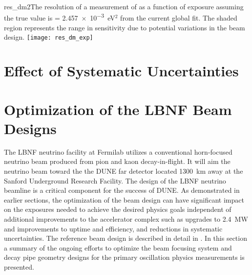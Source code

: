 \begin{cdrfigure}{res_dm2}{The resolution of a measurement of  as a function of exposure assuming the true value is  = \num{2.457e-3}~eV$^2$ from the current global fit. The shaded region represents the range in sensitivity due to potential variations in the beam design.  }
 \texttt{[image: res\_dm\_exp]}
\end{cdrfigure}

\section{Effect of Systematic Uncertainties}
\label{sec:physics-lbnosc-beamnd-req}


\section{Optimization of the LBNF Beam Designs}
\label{sec:physics-lbnosc-beam}

The LBNF neutrino facility at Fermilab utilizes a conventional
horn-focused neutrino beam produced from pion and kaon
decay-in-flight. It will aim the neutrino beam toward the the DUNE far
detector located \num{1300}~km away at the Sanford Underground Research
Facility.  The design of the LBNF neutrino beamline is a critical
component for the success of DUNE. As demonstrated in earlier
sections, the optimization of the beam design can have significant
impact on the exposures needed to achieve the desired physics goals
independent of additional improvements to the accelerator complex such
as upgrades to 2.4~MW and improvements to uptime and efficiency, and
reductions in systematic uncertainties. The reference beam design is
described in detail in \vollbnf. In this section a summary of the
ongoing efforts to optimize the beam focusing system and decay pipe
geometry designs for the primary oscillation physics measurements is
presented.

